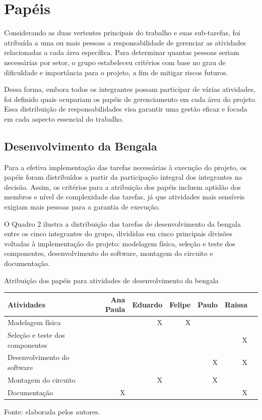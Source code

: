    \section{Papéis}
    
    Considerando as duas vertentes principais do trabalho e suas sub-tarefas, foi atribuída a uma ou mais pessoas a responsabilidade de gerenciar as atividades relacionadas a cada área específica. Para determinar quantas pessoas seriam necessárias por setor, o grupo estabeleceu critérios com base no grau de dificuldade e importância para o projeto, a fim de mitigar riscos futuros.
    
    Dessa forma, embora todos os integrantes possam participar de várias atividades, foi definido quais ocupariam os papéis de gerenciamento em cada área do projeto. Essa distribuição de responsabilidades visa garantir uma gestão eficaz e focada em cada aspecto essencial do trabalho.

    \subsection{Desenvolvimento da Bengala}

    Para a efetiva implementação das tarefas necessárias à execução do projeto, os papéis foram distribuídos a partir da participação integral dos integrantes na decisão. Assim, os critérios para a atribuição dos papéis incluem aptidão dos membros e nível de complexidade das tarefas, já que atividades mais sensíveis exigiam mais pessoas para a garantia de execução.
    
    O Quadro 2 ilustra a distribuição das tarefas de desenvolvimento da bengala entre os cinco integrantes do grupo, divididas em cinco principais divisões voltadas à implementação do projeto: modelagem física, seleção e teste dos componentes, desenvolvimento do software, montagem do circuito e documentação.
    
        \begin{quadro}[!ht]    
            \captionsetup{width=1.0\textwidth} %
            \caption{Atribuição dos papéis para atividades de desenvolvimento da bengala}    
            \begin{tabular}{lrrrrrr}
                \toprule
                Atividades & Ana Paula & Eduardo & Felipe  & Paulo & Raissa \\
                \midrule
                Modelagem física                        &   & X & X  &   &   \\
                Seleção e teste dos componentes         &   &   &   &   & X \\
                Desenvolvimento do software             &   &   &  & X & X \\
                Montagem do circuito                    &   & X &    & X &   \\
                Documentação                            & X &   &    &   & X \\
                \bottomrule
            \end{tabular}
            \caption*{Fonte: elaborada pelos autores.} %
        \end{quadro}

